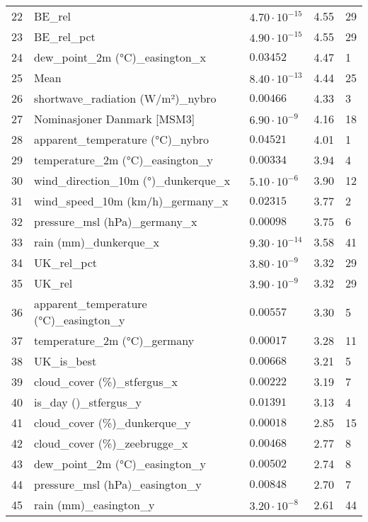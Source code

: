 \begin{table}[H]
\begin{tabular}{r l l l l}
        22 & BE\_rel & $4.70 \cdot 10^{-15}$ & 4.55 & 29 \\
        23 & BE\_rel\_pct & $4.90 \cdot 10^{-15}$ & 4.55 & 29 \\
        24 & dew\_point\_2m (°C)\_easington\_x & $0.03452$ & 4.47 & 1 \\
        25 & Mean & $8.40 \cdot 10^{-13}$ & 4.44 & 25 \\
        26 & shortwave\_radiation (W/m²)\_nybro & $0.00466$ & 4.33 & 3 \\
        27 & Nominasjoner Danmark [MSM3] & $6.90 \cdot 10^{-9}$ & 4.16 & 18 \\
        28 & apparent\_temperature (°C)\_nybro & $0.04521$ & 4.01 & 1 \\
        29 & temperature\_2m (°C)\_easington\_y & $0.00334$ & 3.94 & 4 \\
        30 & wind\_direction\_10m (°)\_dunkerque\_x & $5.10 \cdot 10^{-6}$ & 3.90 & 12 \\
        31 & wind\_speed\_10m (km/h)\_germany\_x & $0.02315$ & 3.77 & 2 \\
        32 & pressure\_msl (hPa)\_germany\_x & $0.00098$ & 3.75 & 6 \\
        33 & rain (mm)\_dunkerque\_x & $9.30 \cdot 10^{-14}$ & 3.58 & 41 \\
        34 & UK\_rel\_pct & $3.80 \cdot 10^{-9}$ & 3.32 & 29 \\
        35 & UK\_rel & $3.90 \cdot 10^{-9}$ & 3.32 & 29 \\
        36 & apparent\_temperature (°C)\_easington\_y & $0.00557$ & 3.30 & 5 \\
        37 & temperature\_2m (°C)\_germany & $0.00017$ & 3.28 & 11 \\
        38 & UK\_is\_best & $0.00668$ & 3.21 & 5 \\
        39 & cloud\_cover (\%)\_stfergus\_x & $0.00222$ & 3.19 & 7 \\
        40 & is\_day ()\_stfergus\_y & $0.01391$ & 3.13 & 4 \\
        41 & cloud\_cover (\%)\_dunkerque\_y & $0.00018$ & 2.85 & 15 \\
        42 & cloud\_cover (\%)\_zeebrugge\_x & $0.00468$ & 2.77 & 8 \\
        43 & dew\_point\_2m (°C)\_easington\_y & $0.00502$ & 2.74 & 8 \\
        44 & pressure\_msl (hPa)\_easington\_y & $0.00848$ & 2.70 & 7 \\
        45 & rain (mm)\_easington\_y & $3.20 \cdot 10^{-8}$ & 2.61 & 44 \\

\end{tabular}
\end{table}
